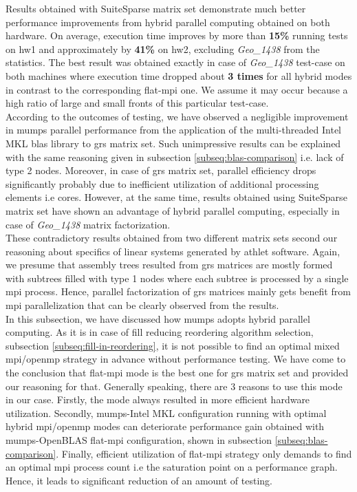 Results obtained with SuiteSparse matrix set demonstrate much better performance improvements from hybrid parallel computing obtained on both hardware. On average, execution time improves by more than \textbf{15\%} running tests on \gls{hw1} and approximately by \textbf{41\%} on \gls{hw2}, excluding \textit{Geo\_1438} from the statistics. The best result was obtained exactly in case of \textit{Geo\_1438} test-case on both machines where execution time dropped about \textbf{3 times} for all hybrid modes in contrast to the corresponding flat-\acrshort{mpi} one. We assume it may occur because a high ratio of large and small fronts of this particular test-case.\\


According to the outcomes of testing, we have observed a negligible improvement in \acrshort{mumps} parallel performance from the application of the multi-threaded Intel MKL \acrshort{blas} library to \acrshort{grs} matrix set. Such unimpressive results can be explained with the same reasoning given in subsection \ref{subseq:blas-comparison} i.e. lack of type 2 nodes. Moreover, in case of \acrshort{grs} matrix set, parallel efficiency drops significantly probably due to inefficient utilization of additional processing elements i.e cores. However, at the same time, results obtained using SuiteSparse matrix set have shown an advantage of hybrid parallel computing, especially in case of \textit{Geo\_1438} matrix factorization.\\


These contradictory results obtained from two different matrix sets second our reasoning about specifics of linear systems generated by \acrshort{athlet} software. Again, we presume that assembly trees resulted from \acrshort{grs} matrices are mostly formed with subtrees filled with type 1 nodes where each subtree is processed by a single \acrshort{mpi} process. Hence, parallel factorization of \acrshort{grs} matrices mainly gets benefit from \acrshort{mpi} parallelization that can be clearly observed from the results.\\



In this subsection, we have discussed how \acrshort{mumps} adopts hybrid parallel computing. As it is in case of fill reducing reordering algorithm selection, subsection \ref{subseq:fill-in-reordering}, it is not possible to find an optimal mixed \acrshort{mpi}/\acrshort{openmp} strategy in advance without performance testing. We have come to the conclusion that flat-\acrshort{mpi} mode is the best one for \acrshort{grs} matrix set and provided our reasoning for that. Generally speaking, there are 3 reasons to use this mode in our case. Firstly, the mode always resulted in more efficient hardware utilization. Secondly,  \acrshort{mumps}-Intel MKL configuration running with optimal hybrid \acrshort{mpi}/\acrshort{openmp} modes can deteriorate performance gain obtained with \acrshort{mumps}-OpenBLAS flat-\acrshort{mpi} configuration, shown in subsection \ref{subseq:blas-comparison}. Finally, efficient utilization of flat-\acrshort{mpi} strategy only demands to find an optimal \acrshort{mpi} process count i.e the saturation point on a performance graph. Hence, it leads to significant reduction of an amount of testing. \\
